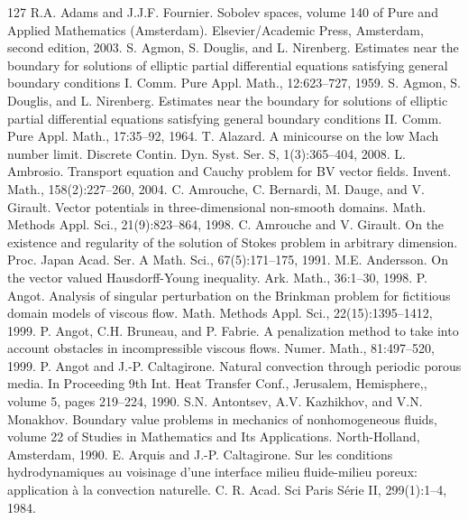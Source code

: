 \clearpage
{}
\label{backmatter:references}
\renewcommand{\refname}{References}
\begin{thebibliography}{127}
 R.A. Adams and J.J.F. Fournier. Sobolev spaces, volume 140 of Pure and Applied Mathematics (Amsterdam). Elsevier/Academic Press, Amsterdam, second edition, 2003.
 S. Agmon, S. Douglis, and L. Nirenberg. Estimates near the boundary for solutions of elliptic partial differential equations satisfying general boundary conditions I. Comm. Pure Appl. Math., 12:623–727, 1959.
 S. Agmon, S. Douglis, and L. Nirenberg. Estimates near the boundary for solutions of elliptic partial differential equations satisfying general boundary conditions II. Comm. Pure Appl. Math., 17:35–92, 1964.
 T. Alazard. A minicourse on the low Mach number limit. Discrete Contin. Dyn. Syst. Ser. S, 1(3):365–404, 2008.
 L. Ambrosio. Transport equation and Cauchy problem for BV vector fields. Invent. Math., 158(2):227–260, 2004.
 C. Amrouche, C. Bernardi, M. Dauge, and V. Girault. Vector potentials in three-dimensional non-smooth domains. Math. Methods Appl. Sci., 21(9):823–864, 1998.
 C. Amrouche and V. Girault. On the existence and regularity of the solution of Stokes problem in arbitrary dimension. Proc. Japan Acad. Ser. A Math. Sci., 67(5):171–175, 1991.
 M.E. Andersson. On the vector valued Hausdorff-Young inequality. Ark. Math., 36:1–30, 1998.
 P. Angot. Analysis of singular perturbation on the Brinkman problem for fictitious domain models of viscous flow. Math. Methods Appl. Sci., 22(15):1395–1412, 1999.
 P. Angot, C.H. Bruneau, and P. Fabrie. A penalization method to take into account obstacles in incompressible viscous flows. Numer. Math., 81:497–520, 1999.
 P. Angot and J.-P. Caltagirone. Natural convection through periodic porous media. In Proceeding 9th Int. Heat Transfer Conf., Jerusalem, Hemisphere,, volume 5, pages 219–224, 1990.
 S.N. Antontsev, A.V. Kazhikhov, and V.N. Monakhov. Boundary value problems in mechanics of nonhomogeneous fluids, volume 22 of Studies in Mathematics and Its Applications. North-Holland, Amsterdam, 1990.
 E. Arquis and J.-P. Caltagirone. Sur les conditions hydrodynamiques au voisinage d’une interface milieu fluide-milieu poreux: application à la convection naturelle. C. R. Acad. Sci Paris Série II, 299(1):1–4, 1984.

\end{thebibliography}
